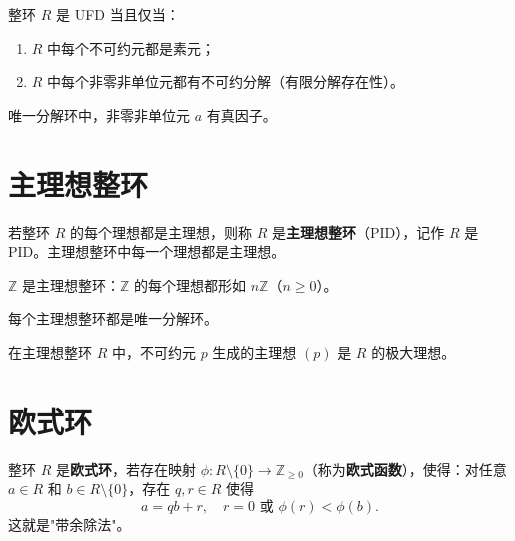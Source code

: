\begin{theorem}
整环 $R$ 是 UFD 当且仅当：
\begin{enumerate}
  \item $R$ 中每个不可约元都是素元；
  \item $R$ 中每个非零非单位元都有不可约分解（有限分解存在性）。
\end{enumerate}
\end{theorem}

\begin{theorem}[定理 3：整环中有真因子的元素]
唯一分解环中，非零非单位元 $a$ 有真因子。
\end{theorem}

\section{主理想整环}

\begin{definition}
若整环 $R$ 的每个理想都是主理想，则称 $R$ 是\textbf{主理想整环}（PID），记作 $R$ 是 PID。主理想整环中每一个理想都是主理想。
\end{definition}

\begin{theorem}[整数环是主理想整环（定理 2）]
$\mathbb{Z}$ 是主理想整环：$\mathbb{Z}$ 的每个理想都形如 $n\mathbb{Z}$（$n \ge 0$）。
\end{theorem}

\begin{theorem}
每个主理想整环都是唯一分解环。
\end{theorem}

\begin{lemma}[引理 2：主理想环的不可约元生成极大理想]
在主理想整环 $R$ 中，不可约元 $p$ 生成的主理想 $(p)$ 是 $R$ 的极大理想。
\end{lemma}

\section{欧式环}

\begin{definition}[欧式环]
整环 $R$ 是\textbf{欧式环}，若存在映射 $\phi\colon R \setminus \{0\} \to \mathbb{Z}_{\ge 0}$（称为\textbf{欧式函数}），使得：对任意 $a \in R$ 和 $b \in R \setminus \{0\}$，存在 $q, r \in R$ 使得
\[
  a = qb + r, \quad r = 0 \text{ 或 } \phi(r) < \phi(b).
\]
这就是"带余除法"。
\end{definition}

